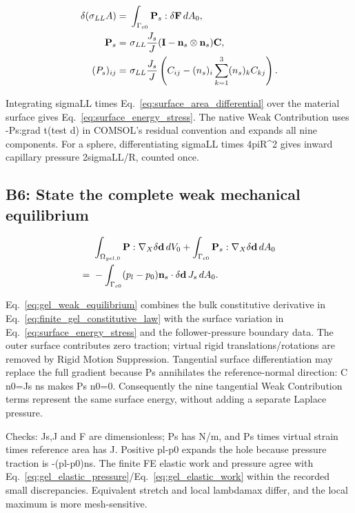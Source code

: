 \documentclass[11pt]{article}
\begin{document}
\begin{align}
\delta(\sigma_{LL}A)= & ~\int_{\Gamma_{c0}}\mathbf P_s : \delta\mathbf F\,dA_0, \notag \\
\mathbf P_s= & ~\sigma_{LL}\frac{J_s}{J}(\mathbf I-\mathbf n_s\otimes\mathbf n_s)\mathbf C, \notag \\
(P_s)_{ij}= & ~\sigma_{LL}\frac{J_s}{J}\left(C_{ij}-(n_s)_i\sum_{k=1}^3(n_s)_kC_{kj}\right). \label{eq:surface_energy_stress}
\end{align}

Integrating sigmaLL times Eq.~\eqref{eq:surface_area_differential} over the material surface gives Eq.~\eqref{eq:surface_energy_stress}. The native Weak Contribution uses -Ps:grad t(test d) in COMSOL's residual convention and expands all nine components. For a sphere, differentiating sigmaLL times 4piR\textasciicircum{}2 gives inward capillary pressure 2sigmaLL/R, counted once.

\subsection{B6: State the complete weak mechanical equilibrium}

\begin{align}
& ~\int_{\Omega_{gel,0}}\mathbf P : \nabla_X\delta\mathbf d\,dV_0+\int_{\Gamma_{c0}}\mathbf P_s : \nabla_X\delta\mathbf d\,dA_0 \notag \\
= & ~-\int_{\Gamma_{c0}}(p_l-p_0)\mathbf n_s\cdot\delta\mathbf d\,J_s\,dA_0. \label{eq:gel_weak_equilibrium}
\end{align}

Eq.~\eqref{eq:gel_weak_equilibrium} combines the bulk constitutive derivative in Eq.~\eqref{eq:finite_gel_constitutive_law} with the surface variation in Eq.~\eqref{eq:surface_energy_stress} and the follower-pressure boundary data. The outer surface contributes zero traction; virtual rigid translations/rotations are removed by Rigid Motion Suppression. Tangential surface differentiation may replace the full gradient because Ps annihilates the reference-normal direction: C n0=Js ns makes Ps n0=0. Consequently the nine tangential Weak Contribution terms represent the same surface energy, without adding a separate Laplace pressure.

Checks: Js,J and F are dimensionless; Ps has N/m, and Ps times virtual strain times reference area has J. Positive pl-p0 expands the hole because pressure traction is -(pl-p0)ns. The finite FE elastic work and pressure agree with Eq.~\eqref{eq:gel_elastic_pressure}/Eq.~\eqref{eq:gel_elastic_work} within the recorded small discrepancies. Equivalent stretch and local lambdamax differ, and the local maximum is more mesh-sensitive.
\end{document}
